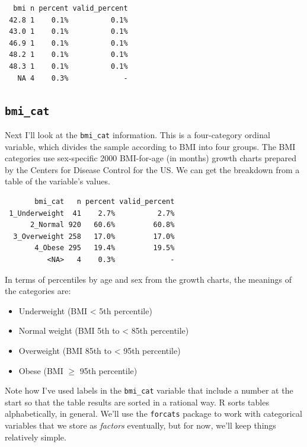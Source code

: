\documentclass[
]{book}
\newenvironment{Shaded}{\begin{snugshade}}{\end{snugshade}}
\newcommand{\KeywordTok}[1]{\textcolor[rgb]{0.13,0.29,0.53}{\textbf{#1}}}
\newcommand{\NormalTok}[1]{#1}
\newcommand{\OperatorTok}[1]{\textcolor[rgb]{0.81,0.36,0.00}{\textbf{#1}}}
\newcommand{\StringTok}[1]{\textcolor[rgb]{0.31,0.60,0.02}{#1}}
\providecommand{\tightlist}{%
  \setlength{\itemsep}{0pt}\setlength{\parskip}{0pt}}
\begin{document}
\begin{verbatim}
  bmi n percent valid_percent
 42.8 1    0.1%          0.1%
 43.0 1    0.1%          0.1%
 46.9 1    0.1%          0.1%
 48.2 1    0.1%          0.1%
 48.3 1    0.1%          0.1%
   NA 4    0.3%             -
\end{verbatim}

\hypertarget{bmi_cat}{%
\subsection{\texorpdfstring{\texttt{bmi\_cat}}{bmi\_cat}}\label{bmi_cat}}

Next I'll look at the \texttt{bmi\_cat} information. This is a four-category ordinal variable, which divides the sample according to BMI into four groups. The BMI categories use sex-specific 2000 BMI-for-age (in months) growth charts prepared by the Centers for Disease Control for the US. We can get the breakdown from a table of the variable's values.

\begin{Shaded}
\end{Shaded}

\begin{verbatim}
       bmi_cat   n percent valid_percent
 1_Underweight  41    2.7%          2.7%
      2_Normal 920   60.6%         60.8%
  3_Overweight 258   17.0%         17.0%
       4_Obese 295   19.4%         19.5%
          <NA>   4    0.3%             -
\end{verbatim}

In terms of percentiles by age and sex from the growth charts, the meanings of the categories are:

\begin{itemize}
\tightlist
\item
  Underweight (BMI \textless{} 5th percentile)
\item
  Normal weight (BMI 5th to \textless{} 85th percentile)
\item
  Overweight (BMI 85th to \textless{} 95th percentile)
\item
  Obese (BMI \(\geq\) 95th percentile)
\end{itemize}

Note how I've used labels in the \texttt{bmi\_cat} variable that include a number at the start so that the table results are sorted in a rational way. R sorts tables alphabetically, in general. We'll use the \texttt{forcats} package to work with categorical variables that we store as \emph{factors} eventually, but for now, we'll keep things relatively simple.
\end{document}
